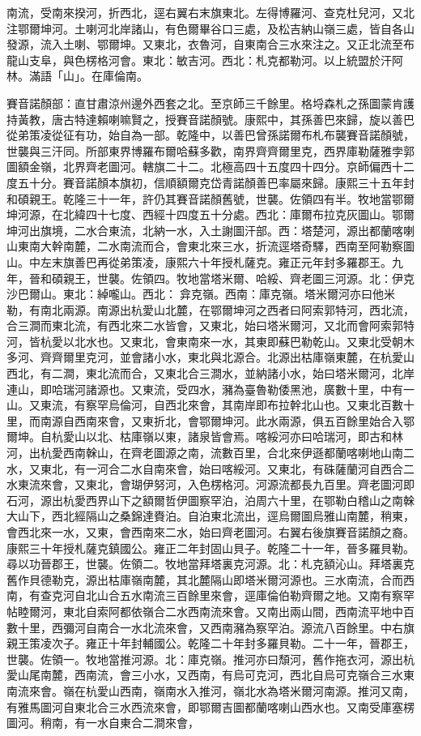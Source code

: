 \begin{pinyinscope}
南流，受南來揆河，折西北，逕右翼右末旗東北。左得博羅河、查克杜兒河，又北注鄂爾坤河。土喇河北岸諸山，有色爾畢谷口三處，及松吉納山嶺三處，皆自各山發源，流入土喇、鄂爾坤。又東北，衣魯河，自東南合三水來注之。又正北流至布龍山支阜，與色楞格河會。東北：敏吉河。西北：札克都勒河。以上統盟於汗阿林。滿語「山」。在庫倫南。

賽音諾顏部：直甘肅涼州邊外西套之北。至京師三千餘里。格埒森札之孫圖蒙肯護持黃教，唐古特達賴喇嘛賢之，授賽音諾顏號。康熙中，其孫善巴來歸，旋以善巴從弟策凌從征有功，始自為一部。乾隆中，以善巴曾孫諾爾布札布襲賽音諾顏號，世襲與三汗同。所部東界博羅布爾哈蘇多歡，南界齊齊爾里克，西界庫勒薩雅孛郭圖額金嶺，北界齊老圖河。轄旗二十二。北極高四十五度四十四分。京師偏西十二度五十分。賽音諾顏本旗初，信順額爾克岱青諾顏善巴率屬來歸。康熙三十五年封和碩親王。乾隆三十一年，許仍其賽音諾顏舊號，世襲。佐領四有半。牧地當鄂爾坤河源，在北緯四十七度、西經十四度五十分處。西北：庫爾布拉克灰圖山。鄂爾坤河出旗境，二水合東流，北納一水，入土謝圖汗部。西：塔楚河，源出都蘭喀喇山東南大幹南麓，二水南流而合，會東北來三水，折流逕塔奇驛，西南至阿勒察圖山。中左末旗善巴再從弟策凌，康熙六十年授札薩克。雍正元年封多羅郡王。九年，晉和碩親王，世襲。佐領四。牧地當塔米爾、哈綏、齊老圖三河源。北：伊克沙巴爾山。東北：綽嚨山。西北：弇克嶺。西南：庫克嶺。塔米爾河亦曰他米勒，有南北兩源。南源出杭愛山北麓，在鄂爾坤河之西者曰阿索郭特河，西北流，合三澗而東北流，有西北來二水皆會，又東北，始曰塔米爾河，又北而會阿索郭特河，皆杭愛以北水也。又東北，會東南來一水，其東即蘇巴勒乾山。又東北受朝木多河、齊齊爾里克河，並會諸小水，東北與北源合。北源出枯庫嶺東麓，在杭愛山西北，有二澗，東北流而合，又東北合三澗水，並納諸小水，始曰塔米爾河，北岸連山，即哈瑞河諸源也。又東流，受四水，瀦為臺魯勒倭黑池，廣數十里，中有一山。又東流，有察罕烏倫河，自西北來會，其南岸即布拉幹北山也。又東北百數十里，而南源自西南來會，又東折北，會鄂爾坤河。此水兩源，俱五百餘里始合入鄂爾坤。自杭愛山以北、枯庫嶺以東，諸泉皆會焉。喀綏河亦曰哈瑞河，即古和林河，出杭愛西南榦山，在齊老圖源之南，流數百里，合北來伊遜都蘭喀喇地山南二水，又東北，有一河合二水自南來會，始曰喀綏河。又東北，有硃薩蘭河自西合二水東流來會，又東北，會瑚伊努河，入色楞格河。河源流都長九百里。齊老圖河即石河，源出杭愛西界山下之額爾哲伊圖察罕泊，泊周六十里，在鄂勒白稽山之南榦大山下，西北經隔山之桑錦達賚泊。自泊東北流出，逕烏爾圖烏雅山南麓，稍東，會西北來一水，又東，會西南來二水，始曰齊老圖河。右翼右後旗賽音諾顏之裔。康熙三十年授札薩克鎮國公。雍正二年封固山貝子。乾隆二十一年，晉多羅貝勒。尋以功晉郡王，世襲。佐領二。牧地當拜塔裏克河源。北：札克額沁山。拜塔裏克舊作貝德勒克，源出枯庫嶺南麓，其北麓隔山即塔米爾河源也。三水南流，合而西南，有查克河自北山合五水南流三百餘里來會，逕庫倫伯勒齊爾之地。又南有察罕帖睦爾河，東北自索阿都依嶺合二水西南流來會。又南出兩山間，西南流平地中百數十里，西彌河自南合一水北流來會，又西南瀦為察罕泊。源流八百餘里。中右旗親王策凌次子。雍正十年封輔國公。乾隆二十年封多羅貝勒。二十一年，晉郡王，世襲。佐領一。牧地當推河源。北：庫克嶺。推河亦曰頹河，舊作拖衣河，源出杭愛山尾南麓，西南流，會三小水，又西南，有烏可克河，西北自烏可克嶺合三水東南流來會。嶺在杭愛山西南，嶺南水入推河，嶺北水為塔米爾河南源。推河又南，有雅馬圖河自東北合三水西流來會，即鄂爾吉圖都蘭喀喇山西水也。又南受庫塞楞圖河。稍南，有一水自東合二澗來會，
\end{pinyinscope}
